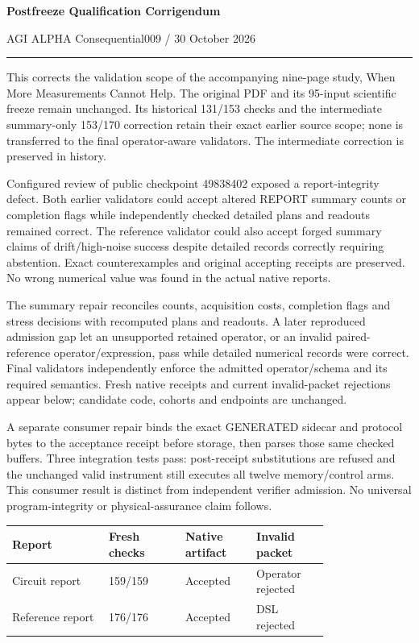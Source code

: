 \documentclass[10pt,letterpaper]{article}
\begin{document}
{\Large\sffamily\bfseries Postfreeze Qualification Corrigendum}\par
{\small AGI ALPHA Consequential009 / 30 October 2026}\par\vspace{5pt}\hrule\vspace{6pt}
This corrects the validation scope of the accompanying nine-page study, When More Measurements Cannot Help. The original PDF and its 95-input scientific freeze remain unchanged. Its historical 131/153 checks and the intermediate summary-only 153/170 correction retain their exact earlier source scope; none is transferred to the final operator-aware validators. The intermediate correction is preserved in history.\par
Configured review of public checkpoint 49838402 exposed a report-integrity defect. Both earlier validators could accept altered REPORT summary counts or completion flags while independently checked detailed plans and readouts remained correct. The reference validator could also accept forged summary claims of drift/high-noise success despite detailed records correctly requiring abstention. Exact counterexamples and original accepting receipts are preserved. No wrong numerical value was found in the actual native reports.\par
The summary repair reconciles counts, acquisition costs, completion flags and stress decisions with recomputed plans and readouts. A later reproduced admission gap let an unsupported retained operator, or an invalid paired-reference operator/expression, pass while detailed numerical records were correct. Final validators independently enforce the admitted operator/schema and its required semantics. Fresh native receipts and current invalid-packet rejections appear below; candidate code, cohorts and endpoints are unchanged.\par
A separate consumer repair binds the exact GENERATED sidecar and protocol bytes to the acceptance receipt before storage, then parses those same checked buffers. Three integration tests pass: post-receipt substitutions are refused and the unchanged valid instrument still executes all twelve memory/control arms. This consumer result is distinct from independent verifier admission. No universal program-integrity or physical-assurance claim follows.\par
\begin{center}\small\begin{tabular}{p{0.24\linewidth}p{0.19\linewidth}p{0.17\linewidth}p{0.18\linewidth}}\toprule Report & Fresh checks & Native artifact & Invalid packet\\\midrule
Circuit report & 159/159 & Accepted & Operator rejected\\
Reference report & 176/176 & Accepted & DSL rejected\\
\bottomrule\end{tabular}\end{center}
\end{document}
